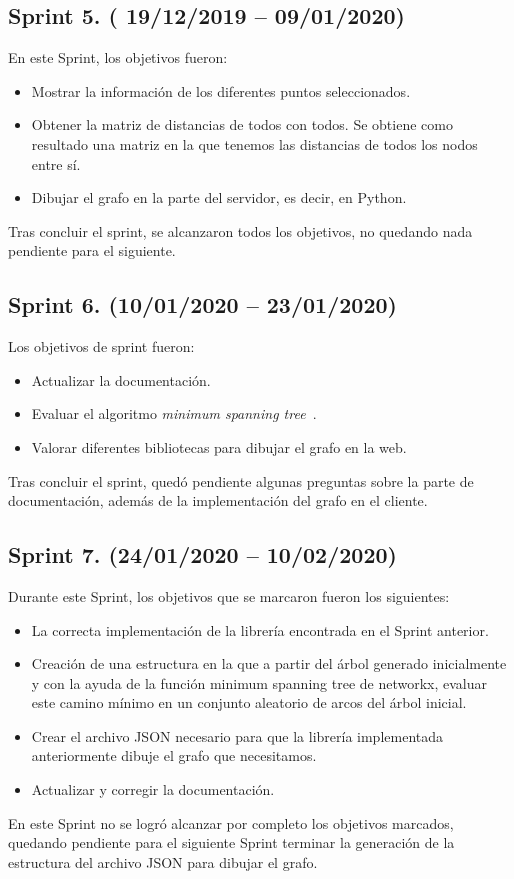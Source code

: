 \subsection{Sprint 5. ( 19/12/2019 -- 09/01/2020)}
En este Sprint, los objetivos fueron:
\begin{itemize}
	\item Mostrar la información de los diferentes puntos seleccionados.
	\item Obtener la matriz de distancias de todos con todos. Se obtiene como resultado una matriz en la que tenemos las distancias de todos los nodos entre sí.
	\item Dibujar el grafo en la parte del servidor, es decir, en Python.
\end{itemize}
Tras concluir el sprint, se alcanzaron todos los objetivos, no quedando nada pendiente para el siguiente.
\subsection{Sprint 6. (10/01/2020 -- 23/01/2020)}
Los objetivos de sprint fueron:
\begin{itemize}
	\item Actualizar la documentación.
	\item Evaluar el algoritmo \textit{minimum spanning tree}~\cite{wiki:minimum-spanning-tree}.
	\item Valorar diferentes bibliotecas para dibujar el grafo en la web.
\end{itemize}
Tras concluir el sprint, quedó pendiente algunas preguntas sobre la parte de documentación, además de la implementación del grafo en el cliente.
\subsection{Sprint 7. (24/01/2020 -- 10/02/2020)}
Durante este Sprint, los objetivos que se marcaron fueron los siguientes:
\begin{itemize}
	\item La correcta implementación de la librería encontrada en el Sprint anterior.
	\item Creación de una estructura en la que a partir del árbol generado inicialmente y con la ayuda de la función minimum spanning tree de networkx, evaluar este camino mínimo en un conjunto aleatorio de arcos del árbol inicial.
	\item Crear el archivo JSON necesario para que la librería implementada anteriormente dibuje el grafo que necesitamos. 
	\item Actualizar y corregir la documentación.
\end{itemize}
En este Sprint no se logró alcanzar por completo los objetivos marcados, quedando pendiente para el siguiente Sprint terminar la generación de la estructura del archivo JSON para dibujar el grafo.

